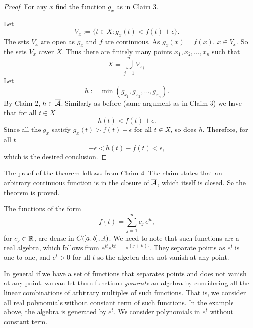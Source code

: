 \begin{proof}
For any $x$ find the function $g_x$ as in Claim 3.

Let
\begin{equation*}
V_x := \bigl\{ t \in X : g_x(t) < f(t) + \epsilon \bigr\}.
\end{equation*}
The sets $V_x$ are open as $g_x$ and $f$ are continuous.
As $g_x(x) = f(x)$, $x \in V_x$.  So the sets $V_x$ cover $X$.  Thus
there
are finitely many points $x_1,x_2,\ldots,x_n$ such that
\begin{equation*}
X = \bigcup_{j=1}^n V_{x_j} .
\end{equation*}
Let
\begin{equation*}
h := \min(g_{x_1},g_{x_2},\ldots,g_{x_n}) .
\end{equation*}
By Claim 2, $h \in \overline{{\mathcal{A}}}$.  Similarly as before (same argument as in
Claim 3) we have that for all
$t \in X$
\begin{equation*}
h(t) < f(t) + \epsilon .
\end{equation*}
Since all the $g_x$ satisfy $g_x(t) > f(t) - \epsilon$ for all $t \in X$, so does $h$.
Therefore, for all $t$
\begin{equation*}
-\epsilon < h(t) - f(t) < \epsilon ,
\end{equation*}
which is the desired conclusion.
\end{proof}

The proof of the theorem follows from Claim 4.  The claim states that an
arbitrary continuous function is in the closure of $\overline{{\mathcal{A}}}$,
which itself is
closed.  So the theorem is proved.

\begin{example}
The functions of the form
\begin{equation*}
f(t) = \sum_{j=1}^n c_j \, e^{jt},
\end{equation*}
for $c_j \in {\mathbb{R}}$,
are dense in $C([a,b],{\mathbb{R}})$.  We need to note that such functions are a real
algebra, which follows from $e^{jt} e^{kt} = e^{(j+k)t}$.  They separate
points as $e^t$ is one-to-one, and $e^t > 0$ for all $t$ so the algebra
does not vanish at any point.
\end{example}

In general if we have a set of functions that separates points and does
not vanish at any point, we can let these functions
\emph{generate}
an algebra
by considering all the linear combinations of arbitrary multiples of such
functions.  That is, we consider all real polynomials without constant term
of such functions.  In the example above,
the algebra is generated by $e^t$.  We 
consider polynomials in $e^t$ without constant term.

